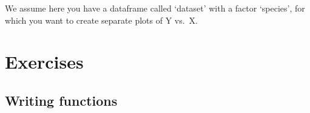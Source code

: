 \documentclass[]{book}
\newenvironment{Shaded}{\begin{snugshade}}{\end{snugshade}}
\newcommand{\ControlFlowTok}[1]{\textcolor[rgb]{0.13,0.29,0.53}{\textbf{#1}}}
\newcommand{\DataTypeTok}[1]{\textcolor[rgb]{0.13,0.29,0.53}{#1}}
\newcommand{\KeywordTok}[1]{\textcolor[rgb]{0.13,0.29,0.53}{\textbf{#1}}}
\newcommand{\NormalTok}[1]{#1}
\newcommand{\OperatorTok}[1]{\textcolor[rgb]{0.81,0.36,0.00}{\textbf{#1}}}
\newcommand{\OtherTok}[1]{\textcolor[rgb]{0.56,0.35,0.01}{#1}}
\newcommand{\StringTok}[1]{\textcolor[rgb]{0.31,0.60,0.02}{#1}}
\begin{document}
We assume here you have a dataframe called `dataset' with a factor `species', for which you want to create separate plots of Y vs.~X.

\begin{Shaded}
\end{Shaded}

\hypertarget{exercises-4}{%
\section{Exercises}\label{exercises-4}}

\hypertarget{writing-functions}{%
\subsection{Writing functions}\label{writing-functions}}
\end{document}
